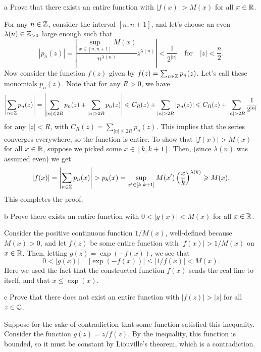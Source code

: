 \documentclass{pset}
\begin{document}
\begin{parts}
  \begin{part}{a}
    Prove that there exists an entire function with $|f(x)| > M(x)$ for all $x\in \mathbb{R}$.
  \end{part}

  For any $n\in \mathbb{Z}$, consider the interval $[n, n+1]$, and let's choose an even $\lambda(n)\in \mathbb{Z}_{>0}$ large enough such that
  \[
    |p_n(z)|=\left|\frac{\sup_{x\in [n, n+1]} M(x)}{n^{\lambda(n)}}z^{\lambda(n)}\right|<\frac{1}{2^{|n|}} \quad\textrm{for}\quad |z|<\frac{n}{2}.
  \]
  Now consider the function $f(z)$ given by $f(z) = \sum_{n\in \mathbb{Z}} p_n(z)$. Let's call these monomials $p_n(z)$. Note that for any $R>0$, we have
  \[
    \left|\sum_{n\in \Z} p_n(z)\right| = \left|\sum_{|n|\leq 2R} p_n(z) + \sum_{|n|>2R} p_n(z)\right| \leq C_R(z) + \sum_{|n|>2R} |p_n(z)| \leq C_R(z) + \sum_{|n|>2R} \frac{1}{2^{|n|}}
  \]
  for any $|z|<R$, with $C_R(z)=\sum_{|n|\leq 2R} p_n(z)$. This implies that the series converges everywhere, so the function is entire. To show that $|f(x)| > M(x)$ for all $x\in \mathbb{R}$, suppose we picked some $x\in [k,k+1]$. Then, (since $\lambda(n)$ was assumed even) we get
  \[
  |f(x)| = \left|\sum_{n\in \mathbb{Z}} p_n(x)\right| > p_k(x) = \sup_{x'\in [k, k+1]} M(x')\left(\frac{x}{k}\right)^{\lambda(k)} \geqslant M(x).
  \]
  This completes the proof.

  \begin{part}{b}
    Prove there exists an entire function with $0 < |g(x)| < M(x)$ for all $x\in \mathbb{R}$.
  \end{part}

  Consider the positive continuous function $1/M(x)$, well-defined because $M(x)>0$, and let $f(z)$ be some entire function with $|f(x)|>1/M(x)$ on $x\in \mathbb{R}$. Then, letting $g(z)=\exp(-f(x))$, we see that 
  \[
    0 < |g(x)| = |\exp(-f(x))| \leq |1/f(x)| < M(x).
  \]
  Here we used the fact that the constructed function $f(x)$ sends the real line to itself, and that $x\leq \exp(x)$.

  \begin{part}{c}
    Prove that there does not exist an entire function with $|f(z)| > |z|$ for all $z\in \mathbb{C}$.
  \end{part}

  Suppose for the sake of contradiction that some function satisfied this inequality. Consider the function $g(z)=z/f(z)$. By the inequality, this function is bounded, so it must be constant by Liouville's theorem, which is a contradiction.
\end{parts}
\end{document}
